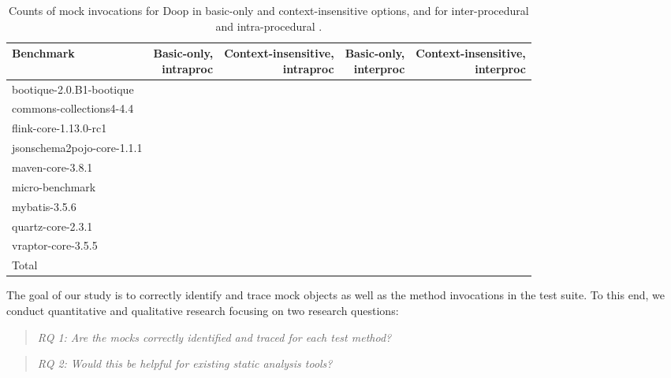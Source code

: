 \begin{table*}
	\centering
	\caption{Counts of mock invocations for Doop in basic-only and context-insensitive options, and for inter-procedural and intra-procedural .}
	\begin{tabular}{lrrrr}
		\toprule
		Benchmark & \thead{Basic-only, \\ intraproc} & \thead{Context-insensitive, \\ intraproc} & \thead{Basic-only, \\ interproc} & \thead{Context-insensitive, \\ interproc} \\
		\midrule
		bootique-2.0.B1-bootique           		&    &    &   &       \\
		commons-collections4-4.4           		&    &    &   &        \\
		flink-core-1.13.0-rc1           		&    &    &   &         \\
		jsonschema2pojo-core-1.1.1         		&    &    &   &          \\
		maven-core-3.8.1   		           		&    &    &   &           \\
		micro-benchmark         		  		&    & 	  &   &           \\
		mybatis-3.5.6         		  			&    &    &   &          \\
		quartz-core-2.3.1        	  			&    &    &   &         \\
		vraptor-core-3.5.5         	  			&    &    &   &         \\
		\bottomrule
		Total         	  						&    &    &   &         \\
	\end{tabular}
	\label{tab:doop-mock-invokes}
\end{table*}

The goal of our study is to correctly identify and trace mock objects as well as the method invocations in the test suite. To this end, we conduct quantitative and qualitative research focusing on two research questions:

\begin{quote}
	\emph{RQ 1: Are the mocks correctly identified and traced for each test method?}
\end{quote}

\begin{quote}
	\emph{RQ 2: Would this be helpful for existing static analysis tools?}
\end{quote}

